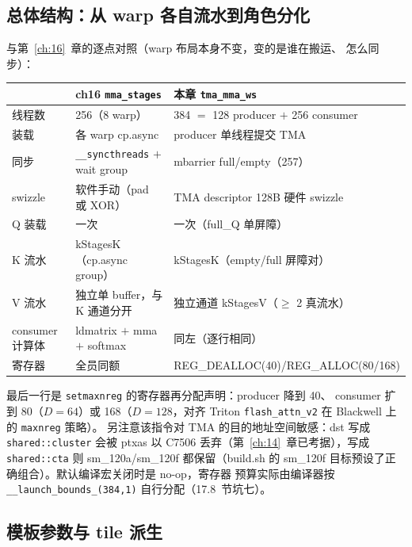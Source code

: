 \subsection{总体结构：从 warp 各自流水到角色分化}

与第~\ref{ch:16}~章的逐点对照（warp 布局本身不变，变的是谁在搬运、
怎么同步）：

\begin{center}
\begin{tabular}{lll}
\toprule
 & ch16 \texttt{mma\_stages} & 本章 \texttt{tma\_mma\_ws} \\
\midrule
线程数 & 256（8 warp） & 384 $=$ 128 producer $+$ 256 consumer \\
装载 & 各 warp cp.async & producer 单线程提交 TMA \\
同步 & \texttt{\_\allowbreak{}\_\allowbreak{}syncthreads} $+$ wait group & mbarrier full/empty（257） \\
swizzle & 软件手动（pad 或 XOR） & TMA descriptor 128B 硬件 swizzle \\
Q 装载 & 一次 & 一次（full\_Q 单屏障） \\
K 流水 & kStagesK（cp.async group） & kStagesK（empty/full 屏障对） \\
V 流水 & 独立单 buffer，与 K 通道分开 & 独立通道 kStagesV（$\ge$ 2 真流水） \\
consumer 计算体 & ldmatrix $+$ mma $+$ softmax & 同左（逐行相同） \\
寄存器 & 全员同额 & REG\_DEALLOC(40)/REG\_ALLOC(80/168) \\
\bottomrule
\end{tabular}
\end{center}

最后一行是 \texttt{setmaxnreg} 的寄存器再分配声明：producer 降到 40、
consumer 扩到 80（$D{=}64$）或 168（$D{=}128$，对齐 Triton
\texttt{flash\_attn\_v2} 在 Blackwell 上的 \texttt{maxnreg} 策略）。
另注意该指令对 TMA 的目的地址空间敏感：dst 写成 \texttt{shared::cluster}
会被 ptxas 以 C7506 丢弃（第~\ref{ch:14}~章已考据），写成
\texttt{shared::cta} 则 sm\_120a/sm\_120f 都保留（build.sh 的 sm\_120f
目标预设了正确组合）。默认编译宏关闭时是 no-op，寄存器
预算实际由编译器按 \texttt{\_\allowbreak{}\_\allowbreak{}launch\_\allowbreak{}bounds\_\allowbreak{}(384,\allowbreak{}1)} 自行分配（17.8~节坑七）。

\subsection{模板参数与 tile 派生}


